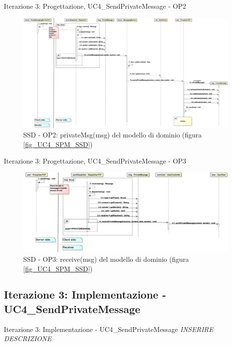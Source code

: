 \begin{frame} {Iterazione 3: Progettazione, UC4\_SendPrivateMessage - OP2}
   \begin{figure}
     \includegraphics[scale=0.105]{image_astah/Iteration_3_DesignModel/UC4_SendPrivateMessage_SSD_2_privateMsg}{\centering}
     \caption{SSD - OP2: privateMsg(msg) del modello di dominio (figura \ref{fig_UC4_SPM_SSD}) }
     \label{fig_UC4_SSD_SRM_2} 
   \end{figure}
\end{frame}

\begin{frame} {Iterazione 3: Progettazione, UC4\_SendPrivateMessage - OP3}
   \begin{figure}
     \includegraphics[scale=0.14]{image_astah/Iteration_3_DesignModel/UC4_SendPrivateMessage_SSD_3_receive.png}{\centering}
     \caption{SSD - OP3: receive(msg) del modello di dominio (figura \ref{fig_UC4_SPM_SSD})}
     \label{fig_UC4_SSD_SRM_3} 
   \end{figure}
\end{frame}


\subsection {Iterazione 3: Implementazione - UC4\_SendPrivateMessage}
\begin{frame} {Iterazione 3: Implementazione - UC4\_SendPrivateMessage}
 \emph{INSERIRE DESCRIZIONE}
\end{frame}

